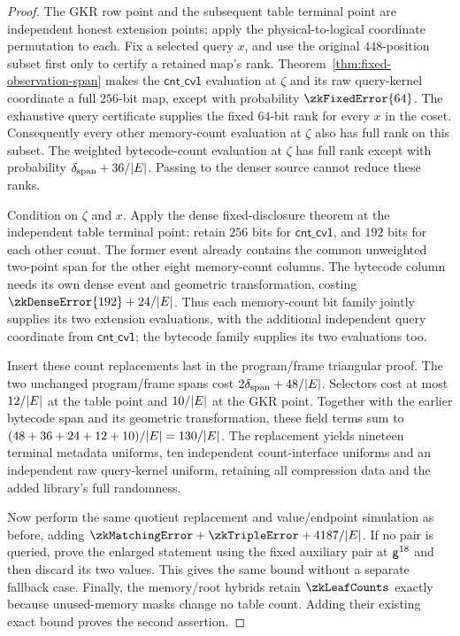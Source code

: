 \begin{proof}
The GKR row point and the subsequent table terminal point are independent honest extension points; apply the physical-to-logical coordinate permutation to each. Fix a selected query $x$, and use the original $448$-position subset first only to certify a retained map's rank. Theorem~\ref{thm:fixed-observation-span} makes the $\mathsf{cnt\_cv1}$ evaluation at $\zeta$ and its raw query-kernel coordinate a full $256$-bit map, except with probability $\zkFixedError{64}$. The exhaustive query certificate supplies the fixed $64$-bit rank for every $x$ in the coset. Consequently every other memory-count evaluation at $\zeta$ also has full rank on this subset. The weighted bytecode-count evaluation at $\zeta$ has full rank except with probability $\delta_{\mathrm{span}}+36/|E|$. Passing to the denser source cannot reduce these ranks.

Condition on $\zeta$ and $x$. Apply the dense fixed-disclosure theorem at the independent table terminal point: retain $256$ bits for $\mathsf{cnt\_cv1}$, and $192$ bits for each other count. The former event already contains the common unweighted two-point span for the other eight memory-count columns. The bytecode column needs its own dense event and geometric transformation, costing $\zkDenseError{192}+24/|\E|$. Thus each memory-count bit family jointly supplies its two extension evaluations, with the additional independent query coordinate from $\mathsf{cnt\_cv1}$; the bytecode family supplies its two evaluations too.

Insert these count replacements last in the program/frame triangular proof. The two unchanged program/frame spans cost $2\delta_{\mathrm{span}}+48/|E|$. Selectors cost at most $12/|E|$ at the table point and $10/|E|$ at the GKR point. Together with the earlier bytecode span and its geometric transformation, these field terms sum to $(48+36+24+12+10)/|E|=130/|E|$. The replacement yields nineteen terminal metadata uniforms, ten independent count-interface uniforms and an independent raw query-kernel uniform, retaining all compression data and the added library's full randomness.

Now perform the same quotient replacement and value/endpoint simulation as before, adding $\zkMatchingError+\zkTripleError+4187/|\E|$. If no pair is queried, prove the enlarged statement using the fixed auxiliary pair at $\mathsf{g}^{18}$ and then discard its two values. This gives the same bound without a separate fallback case. Finally, the memory/root hybrids retain $\zkLeafCounts$ exactly because unused-memory masks change no table count. Adding their existing exact bound proves the second assertion.
\end{proof}

